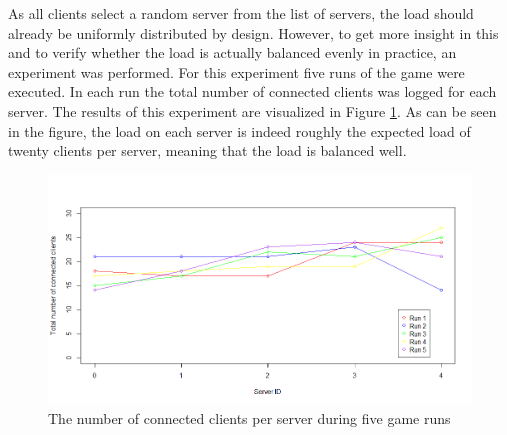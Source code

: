 As all clients select a random server from the list of servers, the load should already be uniformly distributed by design.
However, to get more insight in this and to verify whether the load is actually balanced evenly in practice, an experiment was performed. 
For this experiment five runs of the game were executed. In each run the total number of connected clients was logged for each server. 
The results of this experiment are visualized in Figure \ref{fig:connected_players_plot}. 
As can be seen in the figure, the load on each server is indeed roughly the expected load of twenty clients per server, meaning that the load is balanced well.

\begin{figure}[h!]
  \centering
    \includegraphics[width=\textwidth]{images/connected_players_plot}
    
  \caption{The number of connected clients per server during five game runs}
  \label{fig:connected_players_plot}
\end{figure}
